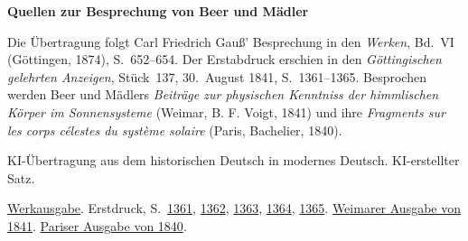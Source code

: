 \clearpage\thispagestyle{empty}
\begin{center}\Large\bfseries Quellen zur Besprechung von Beer und Mädler\end{center}

Die Übertragung folgt Carl Friedrich Gauß’ Besprechung in den \emph{Werken}, Bd.~VI (Göttingen, 1874), S.~652--654. Der Erstabdruck erschien in den \emph{Göttingischen gelehrten Anzeigen}, Stück~137, 30.~August 1841, S.~1361--1365. Besprochen werden Beer und Mädlers \emph{Beiträge zur physischen Kenntniss der himmlischen Körper im Sonnensysteme} (Weimar, B. F. Voigt, 1841) und ihre \emph{Fragments sur les corps célestes du système solaire} (Paris, Bachelier, 1840).

KI-Übertragung aus dem historischen Deutsch in modernes Deutsch. KI-erstellter Satz.

\href{https://gdz.sub.uni-goettingen.de/id/PPN236007467}{Werkausgabe}. Erstdruck, S.~\href{https://images.p.sub.uni-goettingen.de/iiif/image/gdz:PPN385030444_1841_2:00000355/full/full/0/default.jpg}{1361}, \href{https://images.p.sub.uni-goettingen.de/iiif/image/gdz:PPN385030444_1841_2:00000356/full/full/0/default.jpg}{1362}, \href{https://images.p.sub.uni-goettingen.de/iiif/image/gdz:PPN385030444_1841_2:00000357/full/full/0/default.jpg}{1363}, \href{https://images.p.sub.uni-goettingen.de/iiif/image/gdz:PPN385030444_1841_2:00000358/full/full/0/default.jpg}{1364}, \href{https://images.p.sub.uni-goettingen.de/iiif/image/gdz:PPN385030444_1841_2:00000359/full/full/0/default.jpg}{1365}. \href{https://doi.org/10.3931/e-rara-49144}{Weimarer Ausgabe von 1841}. \href{https://books.google.nl/books?id=F85CAQAAMAAJ&pg=PP7}{Pariser Ausgabe von 1840}.

\clearpage

